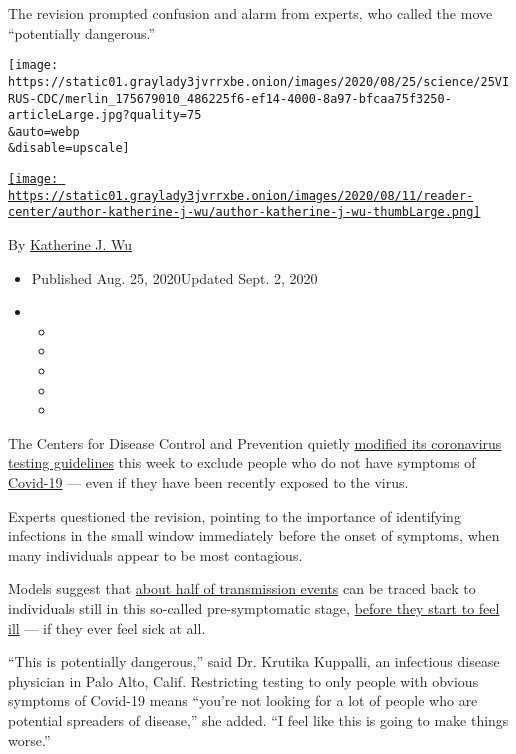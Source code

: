 The revision prompted confusion and alarm from experts, who called the
move ``potentially dangerous.''

\texttt{[image: https://static01.graylady3jvrrxbe.onion/images/2020/08/25/science/25VIRUS-CDC/merlin\_175679010\_486225f6-ef14-4000-8a97-bfcaa75f3250-articleLarge.jpg?quality=75\\\&auto=webp\\\&disable=upscale]}

\href{https://www.nytimes3xbfgragh.onion/by/katherine-j--wu}{\texttt{[image: https://static01.graylady3jvrrxbe.onion/images/2020/08/11/reader-center/author-katherine-j-wu/author-katherine-j-wu-thumbLarge.png]}}

By
\href{https://www.nytimes3xbfgragh.onion/by/katherine-j--wu}{Katherine
J. Wu}

\begin{itemize}
\item
  Published Aug. 25, 2020Updated Sept. 2, 2020
\item
  \begin{itemize}
  \item
  \item
  \item
  \item
  \item
  \end{itemize}
\end{itemize}

The Centers for Disease Control and Prevention quietly
\href{https://www.cdc.gov/coronavirus/2019-ncov/hcp/testing-overview.html}{modified
its coronavirus testing guidelines} this week to exclude people who do
not have symptoms of
\href{https://www.nytimes3xbfgragh.onion/2020/09/02/health/coronavirus-steroids.html}{Covid-19}
--- even if they have been recently exposed to the virus.

Experts questioned the revision, pointing to the importance of
identifying infections in the small window immediately before the onset
of symptoms, when many individuals appear to be most contagious.

Models suggest that
\href{https://www.nature.com/articles/s41591-020-0869-5}{about half of
transmission events} can be traced back to individuals still in this
so-called pre-symptomatic stage,
\href{https://www.pnas.org/content/117/30/17513}{before they start to
feel ill} --- if they ever feel sick at all.

``This is potentially dangerous,'' said Dr. Krutika Kuppalli, an
infectious disease physician in Palo Alto, Calif. Restricting testing to
only people with obvious symptoms of Covid-19 means ``you're not looking
for a lot of people who are potential spreaders of disease,'' she added.
``I feel like this is going to make things worse.''

